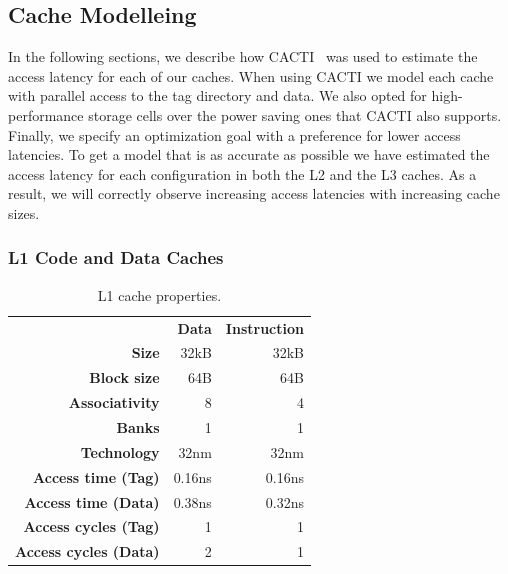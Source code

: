 \subsection{Cache Modelleing}
In the following sections, we describe how CACTI~\cite{Shivakumar2001} was used to estimate the access latency for each of our caches. 
When using CACTI we model each cache with parallel access to the tag directory and data.
We also opted for high-performance storage cells over the power saving ones that CACTI also supports.
Finally, we specify an optimization goal with a preference for lower access latencies.
To get a model that is as accurate as possible we have estimated the access latency for each configuration in both the L2 and the L3 caches.
As a result, we will correctly observe increasing access latencies with increasing cache sizes.

\subsubsection{L1 Code and Data Caches}


\begin{table}[ht]
\centering
\begin{tabular}{rrr}
\toprule
                          & \bf{Data}     & \bf{Instruction} \\
\bf{Size}                 & 32kB          & 32kB      \\
\bf{Block size}           & 64B           & 64B       \\
\bf{Associativity}        & 8             & 4         \\
\bf{Banks}                & 1             & 1         \\
\bf{Technology}           & 32nm          & 32nm      \\
\bf{Access time (Tag)}    & 0.16ns        & 0.16ns    \\
\bf{Access time (Data)}   & 0.38ns        & 0.32ns    \\
\bf{Access cycles (Tag)}  & 1             & 1         \\
\bf{Access cycles (Data)} & 2             & 1         \\
\bottomrule
\end{tabular}
\caption{L1 cache properties.}
\label{tbl:processor_model:l1}
\end{table}

